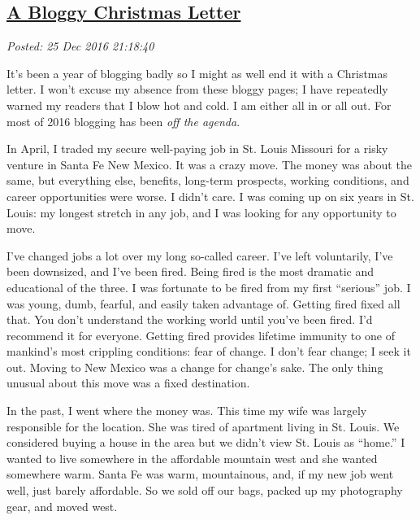 %

\subsection*{\href{https://analyzethedatanotthedrivel.org/2016/12/25/a-bloggy-christmas-letter/}{A Bloggy Christmas Letter}}


\noindent\emph{Posted: 25 Dec 2016 21:18:40}
\vspace{6pt}

It's been a year of blogging badly so I might as well end it with a
Christmas letter. I won't excuse my absence from these bloggy pages; I
have repeatedly warned my readers that I blow hot and cold. I am either
all in or all out. For most of 2016 blogging has been \emph{off the
agenda}.

In April, I traded my secure well-paying job in St. Louis Missouri for a
risky venture in Santa Fe New Mexico. It was a crazy move. The money was
about the same, but everything else, benefits, long-term prospects,
working conditions, and career opportunities were worse. I didn't care.
I was coming up on six years in St. Louis: my longest stretch in any
job, and I was looking for any opportunity to move.

I've changed jobs a lot over my long so-called career. I've left
voluntarily, I've been downsized, and I've been fired. Being fired is
the most dramatic and educational of the three. I was fortunate to be
fired from my first ``serious'' job. I was young, dumb, fearful, and
easily taken advantage of. Getting fired fixed all that. You don't
understand the working world until you've been fired. I'd recommend it
for everyone. Getting fired provides lifetime immunity to one of
mankind's most crippling conditions: fear of change. I don't fear
change; I seek it out. Moving to New Mexico was a change for change's
sake. The only thing unusual about this move was a fixed destination.

In the past, I went where the money was. This time my wife was largely
responsible for the location. She was tired of apartment living in St.
Louis. We considered buying a house in the area but we didn't view St.
Louis as ``home.'' I wanted to live somewhere in the affordable mountain
west and she wanted somewhere warm. Santa Fe was warm, mountainous, and,
if my new job went well, just barely affordable. So we sold off our
bags, packed up my photography gear, and moved west.

